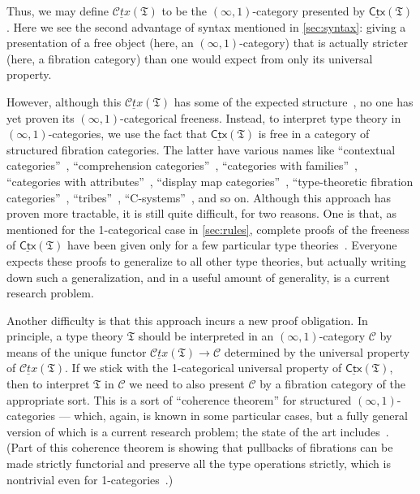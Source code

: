 \documentclass[12pt]{article}
\def\oo{\ensuremath{\infty}}
\def\io{\ensuremath{(\oo,1)}}
\def\C{\mathscr{C}}
\def\fT{\mathfrak{T}}
\def\cCtx{\underline{\mathscr{C}\!\mathit{tx}}}
\def\cCtxT{\cCtx(\fT)}
\def\sCtx{\underline{\mathsf{Ctx}}}
\def\sCtxT{\sCtx(\fT)}
\numberwithin{equation}{section}
\begin{document}
\begin{subappendices}
Thus, we may define $\cCtxT$ to be the \io-category presented by $\sCtxT$.
Here we see the second advantage of syntax mentioned in \cref{sec:syntax}: giving a presentation of a free object (here, an \io-category) that is actually stricter (here, a fibration category) than one would expect from only its universal property.

However, although this $\cCtxT$ has some of the expected structure~\cite{kapulkin:lccqcat-tt,kl:hot-tt},
no one has yet proven its \io-categorical freeness. %
Instead, to interpret type theory in \io-categories, we use the fact that $\sCtxT$ is free in a category of structured fibration categories.
The latter have various names like
``contextual categories''~\cite{cartmell:gatcc}, ``comprehension categories''~\cite{jacobs:compr-cat}, ``categories with families''~\cite{dybjer:internal-tt}, ``categories with attributes''~\cite{cartmell:gatcc}, ``display map categories''~\cite[\S8.3]{taylor:pracfdn}, ``type-theoretic fibration categories''~\cite{shulman:invdia}, ``tribes''~\cite{joyal:tribes}, ``C-systems''~\cite{voevodsky:subquot-csys}, and so on.
Although this approach has proven more tractable, it is still quite difficult, for two reasons.
One is that, as mentioned for the 1-categorical case in \cref{sec:rules}, complete proofs of the freeness of $\sCtxT$ have been given only for a few particular type theories~\cite{streicher:semtt}.
Everyone expects these proofs to generalize to all other type theories, but actually writing down such a generalization, and in a useful amount of generality, is a current research problem.

Another difficulty is that this approach incurs a new proof obligation.
In principle, a type theory $\fT$ should be interpreted in an \io-category $\C$ by means of the unique functor $\cCtxT \to \C$ determined by the universal property of $\cCtxT$.
If we stick with the 1-categorical universal property of $\sCtxT$, then to interpret $\fT$ in $\C$ we need to also present $\C$ by a fibration category of the appropriate sort.
This is a sort of ``coherence theorem'' for structured $\io$-categories --- which, again, is known in some particular cases, but a fully general version of which is a current research problem; the state of the art includes~\cite{klv:ssetmodel,ak:htmtt,gb:topsimpid,shulman:invdia,shulman:elreedy,shulman:eiuniv,stekelenburg:modestkan,gk:univlcc,kapulkin:lccqcat-tt,lw:localuniv}.
(Part of this coherence theorem is showing that pullbacks of fibrations can be made strictly functorial and preserve all the type operations strictly, which is nontrivial even for 1-categories~\cite{curien:subst,hofmann:ttinlccc,hofmann:ssdts,cd:lccc-tt}.)


\end{subappendices}
\end{document}
